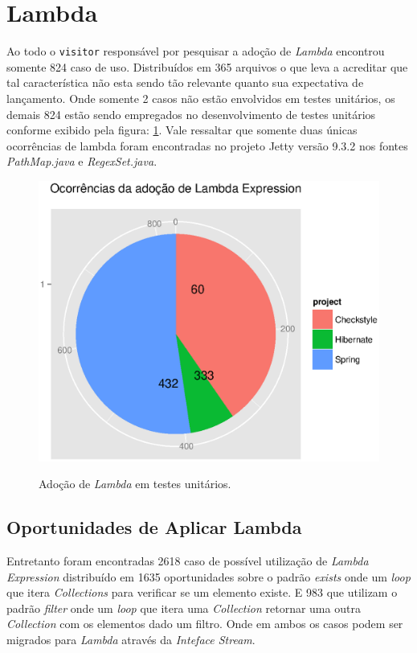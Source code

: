 \section{Lambda}
Ao todo o \texttt{visitor} responsável por pesquisar a adoção de \textit{Lambda} encontrou somente 824 caso de uso. Distribuídos em 365 arquivos o que leva a acreditar que tal característica não esta sendo tão relevante quanto sua expectativa de lançamento. Onde somente 2 casos não estão envolvidos em testes unitários, os demais 824 estão sendo empregados no desenvolvimento de testes unitários conforme exibido pela figura: \ref{fig:AdocaoLambda}. Vale ressaltar que somente duas únicas ocorrências de lambda foram encontradas no projeto Jetty versão 9.3.2 nos fontes \textit{PathMap.java} e \textit{RegexSet.java}.\\

\begin{figure}[h]
	\center
	\includegraphics[scale=0.5]{Imagens/AdocaoLambdaTestes}
	\label{fig:AdocaoLambda}
	\caption{Adoção de \textit{Lambda} em testes unitários.}
\end{figure}



\subsection{Oportunidades de Aplicar Lambda}
Entretanto foram encontradas 2618 caso de possível utilização de \textit{Lambda Expression} distribuído em 1635 oportunidades sobre o padrão \textit{exists} onde um \textit{loop} que itera \textit{Collections} para verificar se um elemento existe. E 983 que utilizam o padrão \textit{filter} onde um \textit{loop} que itera uma \textit{Collection} retornar uma outra \textit{Collection} com os elementos dado um filtro. Onde em ambos os casos podem ser migrados para \textit{Lambda} através da \textit{Inteface Stream}.


